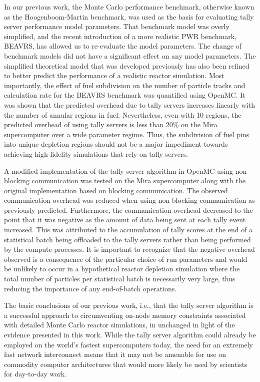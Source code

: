 \documentclass{snamc2013}
\begin{document}
In our previous work, the Monte Carlo performance benchmark, otherwise known as
the Hoogenboom-Martin benchmark, was used as the basis for evaluating tally
server performance model parameters. That benchmark model was overly simplified,
and the recent introduction of a more realistic PWR benchmark, BEAVRS, has
allowed us to re-evaluate the model parameters. The change of benchmark models
did not have a significant effect on any model parameters. The simplified
theoretical model that was developed previously has also been refined to better
predict the performance of a realistic reactor simulation. Most importantly, the
effect of fuel subdivision on the number of particle tracks and calculation rate
for the BEAVRS benchmark was quantified using OpenMC. It was shown that the
predicted overhead due to tally servers increases linearly with the number of
annular regions in fuel. Nevertheless, even with 10 regions, the predicted
overhead of using tally servers is less than 20\% on the Mira supercomputer over
a wide parameter regime. Thus, the subdivision of fuel pins into unique
depletion regions should not be a major impediment towards achieving
high-fidelity simulations that rely on tally servers.

A modified implementation of the tally server algorithm in OpenMC using
non-blocking communication was tested on the Mira supercomputer along with the
original implementation based on blocking communication. The observed
communication overhead was reduced when using non-blocking communication as
previously predicted. Furthermore, the communication overhead decreased to the
point that it was negative as the amount of data being sent at each tally event
increased. This was attributed to the accumulation of tally scores at the end of
a statistical batch being offloaded to the tally servers rather than being
performed by the compute processes. It is important to recognize that the
negative overhead observed is a consequence of the particular choice of run
parameters and would be unlikely to occur in a hypothetical reactor depletion
simulation where the total number of particles per statistical batch is
necessarily very large, thus reducing the importance of any end-of-batch
operations.

The basic conclusions of our previous work, i.e., that the tally server
algorithm is a successful approach to circumventing on-node memory constraints
associated with detailed Monte Carlo reactor simulations, in unchanged in light
of the evidence presented in this work. While the tally server algorithm could
already be employed on the world's fastest supercomputers today, the need for an
extremely fast network interconnect means that it may not be amenable for use on
commodity computer architectures that would more likely be used by scientists
for day-to-day work.
\end{document}
